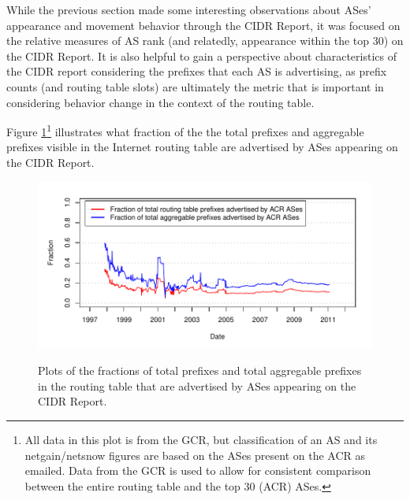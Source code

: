
While the previous section made some interesting observations about ASes'
appearance and movement behavior through the CIDR Report, it was focused on the
relative measures of AS rank (and relatedly, appearance within the top 30) on
the CIDR Report. It is also helpful to gain a perspective about characteristics
of the CIDR report considering the prefixes that each AS is advertising, as
prefix counts (and routing table slots) are ultimately the metric that is
important in considering behavior change in the context of the routing table.

Figure \ref{fig:netcompare}\footnote{All data in this plot is from the GCR, but
classification of an AS and its netgain/netsnow figures are based on the ASes
present on the ACR as emailed. Data from the GCR is used to allow for consistent
comparison between the entire routing table and the top 30 (ACR) ASes.}
illustrates what fraction of the the total prefixes and aggregable prefixes
visible in the Internet routing table are advertised by ASes appearing on the
CIDR Report.

\begin{figure}[h!]
\begin{centering}
\begin{singlespace}
    \includegraphics[width=6in]{figures/acr_gcr_netcompare2.pdf}
    \vspace{-2em}\\
    \caption{Plots of the fractions of total prefixes and total aggregable
    prefixes in the routing table that are advertised by ASes appearing on the
    CIDR Report.}
    \label{fig:netcompare}
\end{singlespace}
\end{centering}
\end{figure}

